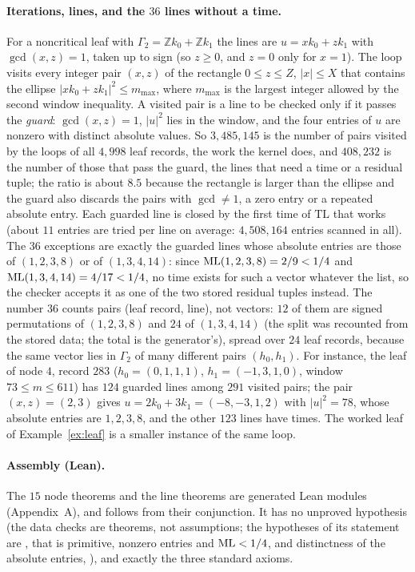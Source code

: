 \documentclass[11pt]{article}
\theoremstyle{remark}
\newcommand{\Z}{\mathbb{Z}}
\newcommand{\lean}[1]{{\small\texttt{\detokenize{#1}}}}
\begin{document}
\paragraph{Iterations, lines, and the $36$ lines without a time.} For a noncritical leaf with $\Gamma_2=\Z k_0+\Z k_1$ the lines are $u=xk_0+zk_1$ with $\gcd(x,z)=1$, taken up to sign (so $z\ge0$, and $z=0$ only for $x=1$). The loop visits every integer pair $(x,z)$ of the rectangle $0\le z\le Z$, $|x|\le X$ that contains the ellipse $|xk_0+zk_1|^2\le m_{\max}$, where $m_{\max}$ is the largest integer allowed by the second window inequality. A visited pair is a line to be checked only if it passes the \emph{guard}: $\gcd(x,z)=1$, $|u|^2$ lies in the window, and the four entries of $u$ are nonzero with distinct absolute values. So $3{,}485{,}145$ is the number of pairs visited by the loops of all $4{,}998$ leaf records, the work the kernel does, and $408{,}232$ is the number of those that pass the guard, the lines that need a time or a residual tuple; the ratio is about $8.5$ because the rectangle is larger than the ellipse and the guard also discards the pairs with $\gcd\ne1$, a zero entry or a repeated absolute entry. Each guarded line is closed by the first time of $\mathrm{TL}$ that works (about $11$ entries are tried per line on average: $4{,}508{,}164$ entries scanned in all). The $36$ exceptions are exactly the guarded lines whose absolute entries are those of $(1,2,3,8)$ or of $(1,3,4,14)$: since $\mathrm{ML}(1,2,3,8)=2/9<1/4$ and $\mathrm{ML}(1,3,4,14)=4/17<1/4$, no time exists for such a vector whatever the list, so the checker accepts it as one of the two stored residual tuples instead. The number $36$ counts pairs (leaf record, line), not vectors: $12$ of them are signed permutations of $(1,2,3,8)$ and $24$ of $(1,3,4,14)$ (the split was recounted from the stored data; the total is the generator's), spread over $24$ leaf records, because the same vector lies in $\Gamma_2$ of many different pairs $(h_0,h_1)$. For instance, the leaf of node $4$, record $283$ ($h_0=(0,1,1,1)$, $h_1=(-1,3,1,0)$, window $73\le m\le611$) has $124$ guarded lines among $291$ visited pairs; the pair $(x,z)=(2,3)$ gives $u=2k_0+3k_1=(-8,-3,1,2)$ with $|u|^2=78$, whose absolute entries are $1,2,3,8$, and the other $123$ lines have times. The worked leaf of Example~\ref{ex:leaf} is a smaller instance of the same loop.

\paragraph{Assembly (Lean).} The $15$ node theorems and the line theorems are generated Lean modules (Appendix~A), and \lean{tree_complete4_real} follows from their conjunction. It has no unproved hypothesis (the data checks are theorems, not assumptions; the hypotheses of its statement are \lean{NearTight v}, that is primitive, nonzero entries and $\mathrm{ML}<1/4$, and distinctness of the absolute entries, \lean{hdist}), and exactly the three standard axioms.
\end{document}
